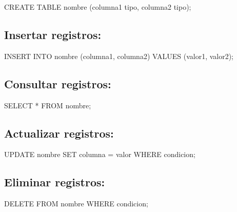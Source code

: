 \documentclass[
  a4paper,
  DIV=11,
  numbers=noendperiod,
  onepage,
  openany]{scrreprt}
\newenvironment{Shaded}{\begin{snugshade}}{\end{snugshade}}
\newcommand{\KeywordTok}[1]{\textcolor[rgb]{0.00,0.23,0.31}{#1}}
\newcommand{\NormalTok}[1]{\textcolor[rgb]{0.00,0.23,0.31}{#1}}
\newcommand{\OperatorTok}[1]{\textcolor[rgb]{0.37,0.37,0.37}{#1}}
\begin{document}
\begin{Shaded}
\begin{Highlighting}[]
\KeywordTok{CREATE} \KeywordTok{TABLE}\NormalTok{ nombre (columna1 tipo, columna2 tipo);}
\end{Highlighting}
\end{Shaded}

\subsection{Insertar registros:}\label{insertar-registros-1}

\begin{Shaded}
\begin{Highlighting}[]
\KeywordTok{INSERT} \KeywordTok{INTO}\NormalTok{ nombre (columna1, columna2) }\KeywordTok{VALUES}\NormalTok{ (valor1, valor2);}
\end{Highlighting}
\end{Shaded}

\subsection{Consultar registros:}\label{consultar-registros-1}

\begin{Shaded}
\begin{Highlighting}[]
\KeywordTok{SELECT} \OperatorTok{*} \KeywordTok{FROM}\NormalTok{ nombre;}
\end{Highlighting}
\end{Shaded}

\subsection{Actualizar registros:}\label{actualizar-registros-1}

\begin{Shaded}
\begin{Highlighting}[]
\KeywordTok{UPDATE}\NormalTok{ nombre }\KeywordTok{SET}\NormalTok{ columna }\OperatorTok{=}\NormalTok{ valor }\KeywordTok{WHERE}\NormalTok{ condicion;}
\end{Highlighting}
\end{Shaded}

\subsection{Eliminar registros:}\label{eliminar-registros-1}

\begin{Shaded}
\begin{Highlighting}[]
\KeywordTok{DELETE} \KeywordTok{FROM}\NormalTok{ nombre }\KeywordTok{WHERE}\NormalTok{ condicion;}
\end{Highlighting}
\end{Shaded}
\end{document}

